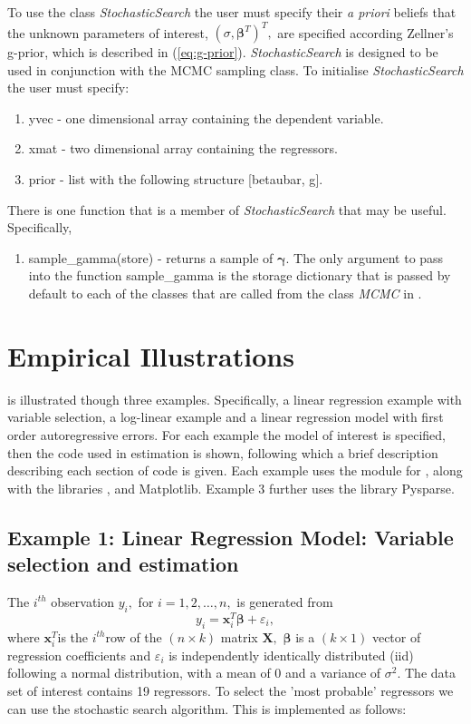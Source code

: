 \documentclass[article]{jss}
\begin{document}
To use the class \emph{StochasticSearch }the user must specify their
\emph{a priori} beliefs that the unknown parameters of interest,
$(\sigma,\bm{\beta}^{T})^{T},$ are specified according Zellner's
g-prior, which is described in (\ref{eq:g-prior}).
\emph{StochasticSearch }is designed to be used in conjunction with the
MCMC sampling class. To initialise \emph{StochasticSearch} the user
must specify:
\begin{enumerate}
\item yvec - one dimensional  array containing the dependent variable. 
\item xmat - two dimensional  array containing the regressors. 
\item prior - list with the following structure {[}betaubar, g{]}.
\end{enumerate}
There is one function that is a member of \emph{StochasticSearch} that
may be useful. Specifically,
\begin{enumerate}
\item sample\_gamma(store) - returns a sample of $\bm{\gamma}.$ The
  only argument to pass into the function sample\_gamma is the storage
  dictionary that is passed by default to each of the classes that are
  called from the class \emph{MCMC }in .
\end{enumerate}

\section{Empirical Illustrations}
\label{sec:Empirical-Illustrations}

 is illustrated though three examples. Specifically, a
linear regression example with variable selection, a log-linear
example and a linear regression model with first order autoregressive
errors.  For each example the model of interest is specified, then the
code used in estimation is shown, following which a brief description
describing each section of code is given. Each example uses the module
for , along with the  libraries
,  and Matplotlib. Example 3 further uses the
library Pysparse.


\subsection{Example 1: Linear Regression Model: Variable selection and estimation}

The $i^{th}$ observation $y_{i},$ for $i=1,2,\dots,n,$ is generated
from\[ y_{i}=\mathbf{x}_{i}^{T}\bm{\beta}+\varepsilon_{i},\] where
$\bm{x}_{i}^{T}$is the $i^{th}$row of the $\left(n\times k\right)$
matrix $\bm{X},$ $\bm{\beta}$ is a $(k\times1)$ vector of regression
coefficients and $\varepsilon_{i}$ is independently identically
distributed (iid) following a normal distribution, with a mean of 0
and a variance of $\sigma^{2}.$ The data set of interest contains 19
regressors.  To select the 'most probable' regressors we can use the
stochastic search algorithm. This is implemented as follows:
\end{document}
